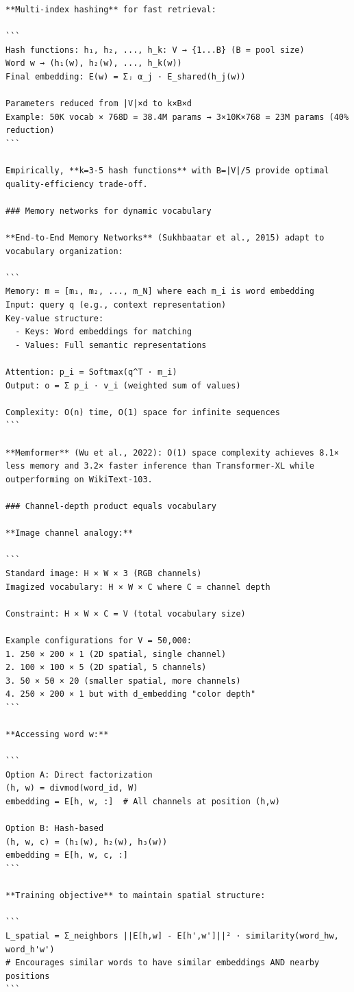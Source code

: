 \documentclass[11pt]{article}
\begin{document}
\begin{verbatim}
**Multi-index hashing** for fast retrieval:

```
Hash functions: h₁, h₂, ..., h_k: V → {1...B} (B = pool size)
Word w → (h₁(w), h₂(w), ..., h_k(w))
Final embedding: E(w) = Σⱼ α_j · E_shared(h_j(w))

Parameters reduced from |V|×d to k×B×d
Example: 50K vocab × 768D = 38.4M params → 3×10K×768 = 23M params (40% reduction)
```

Empirically, **k=3-5 hash functions** with B=|V|/5 provide optimal quality-efficiency trade-off.

### Memory networks for dynamic vocabulary

**End-to-End Memory Networks** (Sukhbaatar et al., 2015) adapt to vocabulary organization:

```
Memory: m = [m₁, m₂, ..., m_N] where each m_i is word embedding
Input: query q (e.g., context representation)
Key-value structure:
  - Keys: Word embeddings for matching
  - Values: Full semantic representations

Attention: p_i = Softmax(q^T · m_i)
Output: o = Σ p_i · v_i (weighted sum of values)

Complexity: O(n) time, O(1) space for infinite sequences
```

**Memformer** (Wu et al., 2022): O(1) space complexity achieves 8.1× less memory and 3.2× faster inference than Transformer-XL while outperforming on WikiText-103.

### Channel-depth product equals vocabulary

**Image channel analogy:**

```
Standard image: H × W × 3 (RGB channels)
Imagized vocabulary: H × W × C where C = channel depth

Constraint: H × W × C = V (total vocabulary size)

Example configurations for V = 50,000:
1. 250 × 200 × 1 (2D spatial, single channel)
2. 100 × 100 × 5 (2D spatial, 5 channels)
3. 50 × 50 × 20 (smaller spatial, more channels)
4. 250 × 200 × 1 but with d_embedding "color depth"
```

**Accessing word w:**

```
Option A: Direct factorization
(h, w) = divmod(word_id, W)
embedding = E[h, w, :]  # All channels at position (h,w)

Option B: Hash-based
(h, w, c) = (h₁(w), h₂(w), h₃(w))
embedding = E[h, w, c, :]
```

**Training objective** to maintain spatial structure:

```
L_spatial = Σ_neighbors ||E[h,w] - E[h',w']||² · similarity(word_hw, word_h'w')
# Encourages similar words to have similar embeddings AND nearby positions
```


\end{verbatim}
\end{document}
